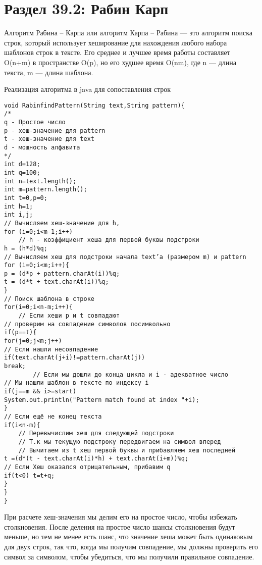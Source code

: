 \section*{Раздел 39.2: Рабин Карп}
\vspace{\baselineskip}
Алгоритм Рабина -- Карпа или алгоритм Карпа -- Рабина --- это алгоритм поиска строк, который использует хеширование для нахождения любого набора шаблонов строк в тексте. Его среднее и лучшее время работы составляет O(n+m) в пространстве O(p), но его худшее время O(nm), где n --- длина текста, m --- длина шаблона.

\vspace{\baselineskip}
Реализация алгоритма в java для сопоставления строк

\vspace{\baselineskip}
\begin{verbatim} 
void RabinfindPattern(String text,String pattern){
/*
q - Простое число
p - хеш-значение для pattern
t - хеш-значение для text
d - мощность алфавита
*/
int d=128;
int q=100;
int n=text.length();
int m=pattern.length();
int t=0,p=0;
int h=1;
int i,j;
// Вычисляем хеш-значение для h,
for (i=0;i<m-1;i++)
	// h - коэффициент хеша для первой буквы подстроки
h = (h*d)%q;
// Вычисляем хеш для подстроки начала text’а (размером m) и pattern
for (i=0;i<m;i++){
p = (d*p + pattern.charAt(i))%q;
t = (d*t + text.charAt(i))%q;
}
// Поиск шаблона в строке
for(i=0;i<n-m;i++){
	// Если хеши p и t совпадают
// проверим на совпадение символов посимвольно
if(p==t){
for(j=0;j<m;j++)
// Если нашли несовпадение
if(text.charAt(j+i)!=pattern.charAt(j))
break;
		// Если мы дошли до конца цикла и i - адекватное число
// Мы нашли шаблон в тексте по индексу i
if(j==m && i>=start)
System.out.println("Pattern match found at index "+i);
}
// Если ещё не конец текста
if(i<n-m){
	// Перевычислим хеш для следующей подстроки
	// Т.к мы текущую подстроку передвигаем на символ вперед 
	// Вычитаем из t хеш первой буквы и прибавляем хеш последней
t =(d*(t - text.charAt(i)*h) + text.charAt(i+m))%q;
// Если Хеш оказался отрицательным, прибавим q
if(t<0) t=t+q;
}
}
}
\end{verbatim}

\newpage

При расчете хеш-значения мы делим его на простое число, чтобы избежать столкновения. После деления на простое число шансы столкновения будут меньше, но тем не менее есть шанс, что значение хеша может быть одинаковым для двух строк, так что, когда мы получим совпадение, мы должны проверить его символ за символом, чтобы убедиться, что мы получили правильное совпадение.

